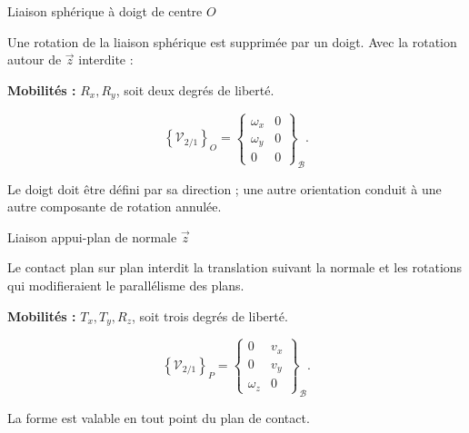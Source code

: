 \begin{TLLiaisonCard}{Liaison sphérique à doigt de centre \(O\)}
\begin{minipage}[c]{.18\linewidth}\centering
\TLSymSpheriqueDoigt
\end{minipage}\hfill
\begin{minipage}[c]{.77\linewidth}
Une rotation de la liaison sphérique est supprimée par un doigt. Avec la
rotation autour de \(\vec z\) interdite :

\textbf{Mobilités :} \(R_x,R_y\), soit deux degrés de liberté.

\[
\left\{\mathcal V_{2/1}\right\}_O=
\left\{\begin{array}{cc}
\omega_x&0\\\omega_y&0\\0&0
\end{array}\right\}_{\mathcal B}.
\]

Le doigt doit être défini par sa direction ; une autre orientation conduit à
une autre composante de rotation annulée.
\end{minipage}
\end{TLLiaisonCard}

\begin{TLLiaisonCard}{Liaison appui-plan de normale \(\vec z\)}
\begin{minipage}[c]{.18\linewidth}\centering
\TLSymAppuiPlan
\end{minipage}\hfill
\begin{minipage}[c]{.77\linewidth}
Le contact plan sur plan interdit la translation suivant la normale et les
rotations qui modifieraient le parallélisme des plans.

\textbf{Mobilités :} \(T_x,T_y,R_z\), soit trois degrés de liberté.

\[
\left\{\mathcal V_{2/1}\right\}_P=
\left\{\begin{array}{cc}
0&v_x\\0&v_y\\\omega_z&0
\end{array}\right\}_{\mathcal B}.
\]

La forme est valable en tout point du plan de contact.
\end{minipage}
\end{TLLiaisonCard}

